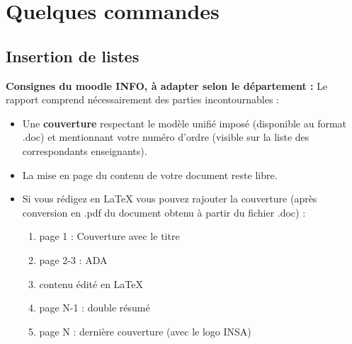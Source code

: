 \newpage
\section{Quelques commandes}
\subsection{Insertion de listes}
\textbf{Consignes du moodle INFO, à adapter selon le département :}
\newline
Le rapport comprend nécessairement des parties incontournables :
\begin{itemize}[label=$\bullet$] %
    \item Une \textbf{couverture} respectant le modèle unifié imposé (disponible au format .doc) et mentionnant votre numéro d'ordre (visible sur la liste des correspondants enseignants). 
    \item La mise en page du contenu de votre document reste libre.
    \item Si vous rédigez en LaTeX vous pouvez rajouter la couverture (après conversion en .pdf du document obtenu à partir du fichier .doc) :
         \begin{enumerate}
            \item page 1 : Couverture avec le titre
            \item page 2-3 : ADA
            \item contenu édité en LaTeX
            \item page N-1 : double résumé 
            \item page N : dernière couverture (avec le logo INSA)
        \end{enumerate}
        

\end{itemize}
